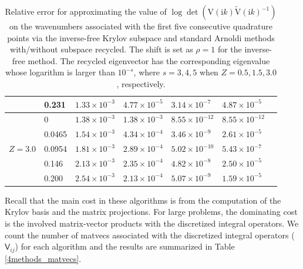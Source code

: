 \begin{table}[H]
\begin{tabular}{ |M{1.5cm}|M{2.0cm}|M{2.2cm} |M{2.2cm}|M{3cm}|M{3cm}|M{2.2cm}| }
                                   & 0.231    & $1.33\times 10^{-3}$  & $4.77\times 10^{-5}$  &$3.14\times 10^{-7}$ &$4.87\times 10^{-5}$\\ 
    \hline
    \hline
       & 0        & $1.38\times 10^{-3}$  & $1.38\times 10^{-3}$  &$8.55\times 10^{-12}$ &$8.55\times 10^{-12}$\\ 
                                   & 0.0465   & $1.54\times 10^{-3}$  & $4.34\times 10^{-4}$  &$3.46\times 10^{-9}$  &$2.61\times 10^{-5}$\\ 
                                   & 0.0954   & $1.81\times 10^{-3}$  & $2.89\times 10^{-4}$  &$5.02\times 10^{-10}$ &$5.43\times 10^{-7}$\\ 
                                   & 0.146    & $2.13\times 10^{-3}$  & $2.35\times 10^{-4}$  &$4.82\times 10^{-8}$  &$2.50\times 10^{-5}$\\ 
                                   & 0.200    & $2.54\times 10^{-3}$  & $2.13\times 10^{-4}$  &$5.07\times 10^{-9}$  &$1.59\times 10^{-5}$\\ 
    \hline
    \end{tabular}
    \caption{Relative error for approximating the value of $\log\det(\mathrm{V}(\mathrm{i}k)\tilde{\mathrm{V}}(\mathrm{i}k)^{-1})$ on the wavenumbers associated with the first five consecutive 
    quadrature points via the inverse-free Krylov subspace and standard Arnoldi methods with/without subspace recycled. The shift is set as $\rho = 1$ for the inverse-free method. The recycled eigenvector has the corresponding eigenvalue whose logarithm
    is larger than $10^{-s}$, where $s = 3, 4, 5$ when $Z = 0.5, 1.5, 3.0$, respectively.}
    \label{Table lists the logdet}
    \end{table}
    
    Recall that the main cost in these algorithms is from the computation of the Krylov basis and the matrix projections. For large problems, 
    the dominating cost is the involved matrix-vector products with the discretized integral operators. We count the number of matvecs associated with the 
    discretized integral operators ($\mathsf{V}_{ij}$) for each algorithm and the results are summarized in Table \ref{4methods_matvecs}.


